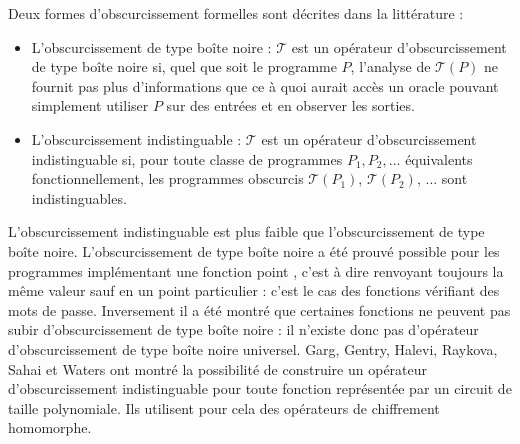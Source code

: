 Deux formes d'obscurcissement formelles sont décrites dans la littérature \cite{BR13} :
\begin{itemize}
 \item L'obscurcissement de type boîte noire : $\mathcal{T}$ est un opérateur d'obscurcissement de type boîte noire si, quel que soit le programme $P$, l'analyse de $\mathcal{T}(P)$ ne fournit pas plus d'informations que ce à quoi aurait accès un oracle pouvant simplement utiliser $P$ sur des entrées et en observer les sorties.
 \item L'obscurcissement indistinguable : $\mathcal{T}$ est un opérateur d'obscurcissement indistinguable si, pour toute classe de programmes $P_1, P_2, ...$ équivalents fonctionnellement, les programmes obscurcis $\mathcal{T}(P_1)$, $\mathcal{T}(P_2)$, ... sont indistinguables.%
\end{itemize}




L'obscurcissement indistinguable est plus faible que l'obscurcissement de type boîte noire.
L'obscurcissement de type boîte noire a été prouvé possible pour les programmes implémentant une fonction point \cite{LPS04}, c'est à dire renvoyant toujours la même valeur sauf en un point particulier : c'est le cas des fonctions vérifiant des mots de passe. 
Inversement il a été montré que certaines fonctions ne peuvent pas subir d'obscurcissement de type boîte noire \cite{BGI12} : il n'existe donc pas d'opérateur d'obscurcissement de type boîte noire universel.
Garg, Gentry, Halevi, Raykova, Sahai et Waters \cite{GGH13} ont montré la possibilité de construire un opérateur d'obscurcissement indistinguable pour toute fonction représentée par un circuit de taille polynomiale. Ils utilisent pour cela des opérateurs de chiffrement homomorphe.

